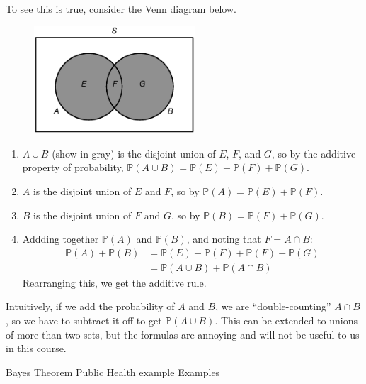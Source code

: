 \documentclass[12pt]{article}
\theoremstyle{definition}
\theoremstyle{remark}
\def\P{{\mathbb P}}
\begin{document}
To see this is true, consider the Venn diagram below.
\begin{figure}[H]
\centering
\includegraphics[width=6cm]{additive.eps}
\end{figure}
\begin{enumerate}
\item $A \cup B$ (show in gray) is the disjoint union of $E$, $F$, and $G$, so by the additive property of probability, $\P(A \cup B) = \P(E) + \P(F) + \P(G)$.
\item $A$ is the disjoint union of $E$ and $F$, so by $\P(A) = \P(E) + \P(F)$.
\item $B$ is the disjoint union of $F$ and $G$, so by $\P(B) = \P(F) + \P(G)$.
\item Addding together $\P(A)$ and $\P(B)$, and noting that $F = A \cap B$:
\begin{align*}
\P(A) + \P(B) &= \P(E) + \P(F) + \P(F) + \P(G) \\
&= \P(A \cup B) + \P(A \cap B)
\end{align*}
Rearranging this, we get the additive rule.
\end{enumerate}
Intuitively, if we add the probability of $A$ and $B$, we are ``double-counting'' $A \cap B$, so we have to subtract it off to get $\P(A \cup B)$. This can be extended to unions of more than two sets, but the formulas are annoying and will not be useful to us in this course. 

Bayes Theorem
Public Health example
Examples
\end{document}
